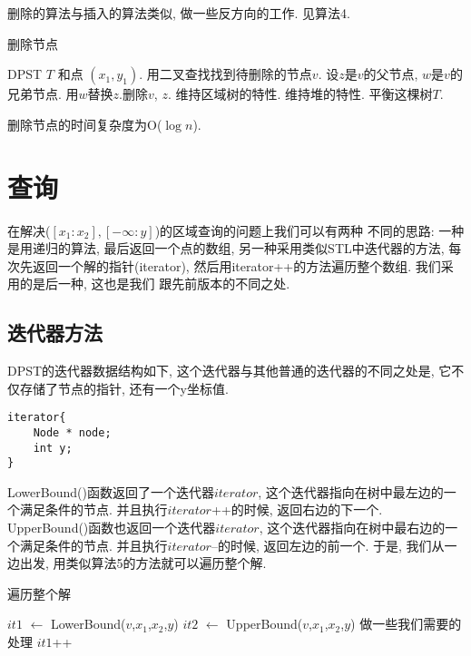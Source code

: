 \documentclass[a4paper]{article}
\begin{document}
删除的算法与插入的算法类似, 做一些反方向的工作. 见算法4. 

\begin{algorithm}[!h]
\caption{删除节点} \label{alg:pst_delete}
    \begin{algorithmic}[1]
    \REQUIRE DPST $T$ 和点 $(x_1,y_1)$. 
    \STATE 用二叉查找找到待删除的节点$v$. 设$z$是$v$的父节点, $w$是$v$的兄弟节点.
    \STATE 用$w$替换$z$.删除$v$, $z$.
    \STATE 维持区域树的特性.
    \STATE 维持堆的特性. 
    \STATE 平衡这棵树$T$.
    \end{algorithmic}
\end{algorithm}
删除节点的时间复杂度为O($\log n$).

\section{查询}
在解决($[x_1:x_2],[-\infty:y]$)的区域查询的问题上我们可以有两种
不同的思路: 一种是用递归的算法\cite{CG_03}, 最后返回一个点的数组, 另一种采用类似STL中迭代器的方法, 每次先返回一个解的指针(iterator), 然后用iterator++的方法遍历整个数组. 我们采用的是后一种, 这也是我们
跟先前版本的不同之处.

\subsection{迭代器方法}
DPST的迭代器数据结构如下, 这个迭代器与其他普通的迭代器的不同之处是, 它不仅存储了节点的指针, 还有一个y坐标值.
\begin{verbatim}
iterator{
    Node * node;
    int y;
}
\end{verbatim}

LowerBound()函数返回了一个迭代器$iterator$, 这个迭代器指向在树中最左边的一个满足条件的节点. 
并且执行$iterator$++的时候, 返回右边的下一个. UpperBound()函数也返回一个迭代器$iterator$, 这个迭代器指向在树中最右边的一个满足条件的节点. 并且执行$iterator$--的时候, 返回左边的前一个. 
于是, 我们从一边出发, 用类似算法5的方法就可以遍历整个解. 

\begin{algorithm}[!h]
\caption{遍历整个解} \label{alg:traversing}
	\begin{algorithmic}[1]
	\STATE $it1$ $\leftarrow$ LowerBound($v$,$x_1$,$x_2$,$y$)
	\STATE $it2$ $\leftarrow$ UpperBound($v$,$x_1$,$x_2$,$y$)
	\REPEAT
	\STATE 做一些我们需要的处理
	\STATE $it1$++
	\end{algorithmic}
\end{algorithm}
\end{document}
